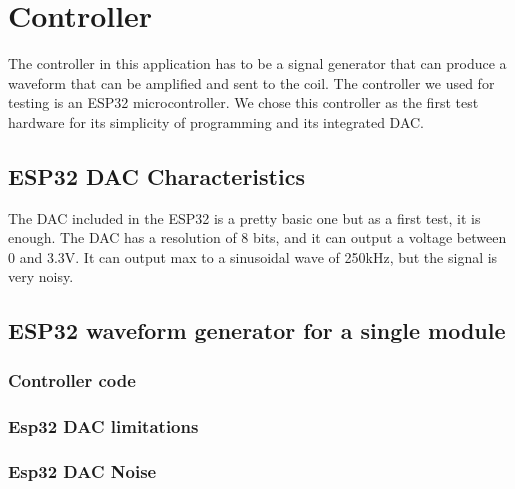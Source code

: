 \section{Controller}
The controller in this application has to be a signal generator that can produce a waveform that can be amplified and sent to the coil.
The controller we used for testing is an ESP32 microcontroller.
We chose this controller as the first test hardware for its simplicity of programming and its integrated DAC.

\subsection{ESP32 DAC Characteristics}
The DAC included in the ESP32 is a pretty basic one but as a first test, it is enough.
The DAC has a resolution of 8 bits, and it can output a voltage between 0 and 3.3V.
It can output max to a sinusoidal wave of 250kHz, but the signal is very noisy.


\subsection{ESP32 waveform generator for a single module}

\subsubsection{Controller code}

\subsubsection{Esp32 DAC limitations}

\subsubsection{Esp32 DAC Noise}
